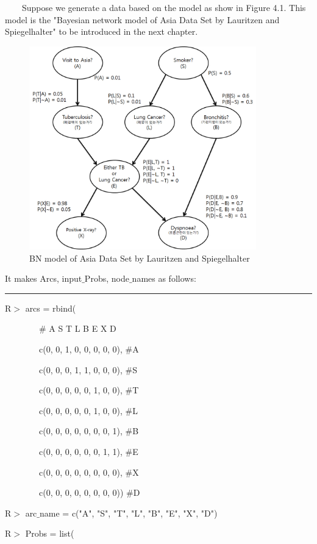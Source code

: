 ~~~~Suppose we generate a data based on the model as show in Figure 4.1. This model is the "Bayesian network model of Asia Data Set by Lauritzen and Spiegelhalter" to be introduced in the next chapter.

\begin{figure}[t]
	\centering
	\includegraphics[height=250pt]{Real_Asia}
	\caption{BN model of Asia Data Set by Lauritzen and Spiegelhalter}
\end{figure}

It makes Arcs, input$\_$Probs, node$\_$names as follows:

\begin{center}\rule[0.5ex]{0.9\columnwidth}{1pt}\end{center}

R$>$ arcs = rbind(

		~~~~~~~~$\#$	A	S	T	L	B	E	X	D
		
		~~~~~~~~c(0,	0,	1,	0,	0,	0,	0,	0),	$\#$A
		
		~~~~~~~~c(0,	0,	0,	1,	1,	0,	0,	0),	$\#$S
		
		~~~~~~~~c(0,	0,	0,	0,	0,	1,	0,	0),	$\#$T
		
		~~~~~~~~c(0,	0,	0,	0,	0,	1,	0,	0),	$\#$L
		
		~~~~~~~~c(0,	0,	0,	0,	0,	0,	0,	1),	$\#$B
		
		~~~~~~~~c(0,	0,	0,	0,	0,	0,	1,	1),	$\#$E
		
		~~~~~~~~c(0,	0,	0,	0,	0,	0,	0,	0),	$\#$X
		
		~~~~~~~~c(0,	0,	0,	0,	0,	0,	0,	0))	$\#$D
		
R$>$ arc$\_$name = c("A", "S", "T", "L", "B", "E", "X", "D")

R$>$ Probs = list(

